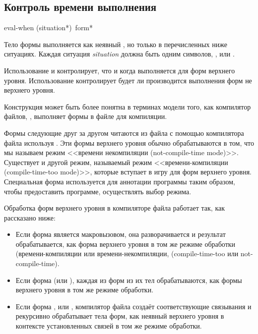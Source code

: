 \subsection{Контроль времени выполнения}

\begin{defspec}
eval-when ({situation}*) {\,form}*

Тело формы  выполняется как неявный , но только в
перечисленных ниже ситуациях. Каждая ситуация \emph{situation} должна быть
одним символов, ,  или .

Использование  и  контролирует, что и
когда выполняется для форм верхнего уровня. Использование 
контролирует будет ли производится выполнения форм не верхнего уровня.

Конструкция  может быть более понятна в терминах модели того,
как компилятор файлов, , выполняет формы в файле для
компиляции.

Формы следующие друг за другом читаются из файла с помощью компилятора файла
используя . Эти формы верхнего уровня обычно обрабатываются в том,
что мы называем режим <<времени некомпиляции (not-compile-time
mode)>>. Существует и другой режим, называемый режим <<времени-компиляции
(compile-time-too mode)>>, которые вступает в игру для форм верхнего
уровня. Специальная форма  используется для аннотации программы
таким образом, чтобы предоставить программе, осуществлять выбор режима.

Обработка форм верхнего уровня в компиляторе файла работает так, как
рассказано ниже:

\begin{itemize}

\item Если форма является макровызовом, она разворачивается и результат
  обрабатывается, как форма верхнего уровня в том же режиме обработки
  (времени-компиляции или времени-некомпиляции, (compile-time-too или not-compile-time).

\item Если форма  (или ), каждая из форм из их тел
  обрабатываются, как формы верхнего уровня в том же режиме обработки.

\item Если форма ,  или
  , компилятор файла создаёт соответствующие связывания и
  рекурсивно обрабатывает тела форм, как неявный  верхнего уровня
  в контексте установленных связей в том же режиме обработки.


\end{itemize}
\end{defspec}
